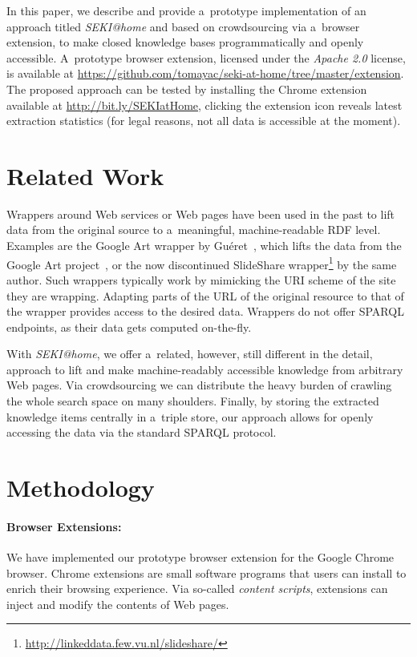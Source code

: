 \documentclass[runningheads,a4paper]{llncs}
\begin{document}
In this paper, we describe and provide a~prototype implementation
of an approach titled \emph{SEKI@home} and
based on crowdsourcing via a~browser extension,
to make closed knowledge bases programmatically and openly accessible.
A~prototype browser extension,
licensed under the \emph{Apache 2.0} license,
is available at \url{https://github.com/tomayac/seki-at-home/tree/master/extension}.\\
The proposed approach can be tested by installing the Chrome extension
available at \url{http://bit.ly/SEKIatHome},
clicking the extension icon reveals latest extraction statistics
(for legal reasons, not all data is accessible at the moment).

\section{Related Work} \label{sec:related-work}
Wrappers around Web services or Web pages have been used in the past
to lift data from the original source to a~meaningful, machine-readable RDF level.
Examples are the Google Art wrapper by Guéret~\cite{gueret2011},
which lifts the data from the Google Art project~\cite{sood2011},
or the now discontinued SlideShare wrapper\footnote{\url{http://linkeddata.few.vu.nl/slideshare/}} by the same author.
Such wrappers typically work by mimicking the URI scheme of the site they are wrapping.
Adapting parts of the URL of the original resource to that of the wrapper
provides access to the desired data.
Wrappers do not offer SPARQL endpoints, as their data gets computed on-the-fly.

With \emph{SEKI@home}, we offer a~related, however, still different in the detail,
approach to lift and make machine-readably accessible
knowledge from arbitrary Web pages.
Via crowdsourcing we can distribute the heavy burden
of crawling the whole search space on many shoulders.
Finally, by storing the extracted knowledge items centrally in a~triple store,
our approach allows for openly accessing the data via the standard SPARQL protocol.

\section{Methodology} \label{sec:methodology}
\paragraph{Browser Extensions:}
We have implemented our prototype browser extension for the Google Chrome browser.
Chrome extensions are small software programs that users can install
to enrich their browsing experience.
Via so-called \emph{content scripts},
extensions can inject and modify the contents of Web pages.
\end{document}
